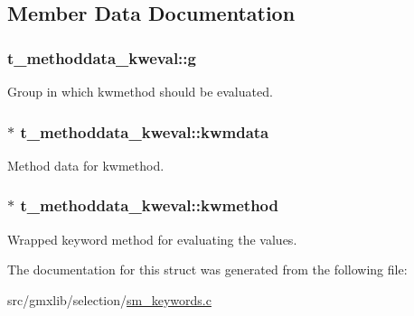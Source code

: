 \subsection{\-Member \-Data \-Documentation}
\hypertarget{structt__methoddata__kweval_a338ffa357616c7e611b0002cc98a8a50}{
\subsubsection[{g}]{ {\bf t\-\_\-methoddata\-\_\-kweval\-::g}}}\label{structt__methoddata__kweval_a338ffa357616c7e611b0002cc98a8a50}
\-Group in which {\ttfamily kwmethod} should be evaluated. \hypertarget{structt__methoddata__kweval_a6fe52d6fadf8fe74e5938ca53512dafd}{
\subsubsection[{kwmdata}]{$\ast$ {\bf t\-\_\-methoddata\-\_\-kweval\-::kwmdata}}}\label{structt__methoddata__kweval_a6fe52d6fadf8fe74e5938ca53512dafd}
\-Method data for {\ttfamily kwmethod}. \hypertarget{structt__methoddata__kweval_a4f08ad0c6088affebdfd5cb0badb2cce}{
\subsubsection[{kwmethod}]{$\ast$ {\bf t\-\_\-methoddata\-\_\-kweval\-::kwmethod}}}\label{structt__methoddata__kweval_a4f08ad0c6088affebdfd5cb0badb2cce}
\-Wrapped keyword method for evaluating the values. 

\-The documentation for this struct was generated from the following file\-:\begin{DoxyCompactItemize}
\item 
src/gmxlib/selection/\hyperlink{sm__keywords_8c}{sm\-\_\-keywords.\-c}\end{DoxyCompactItemize}
